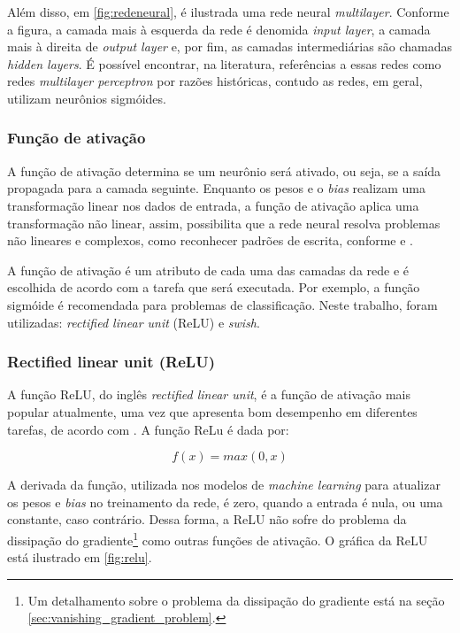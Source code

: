 Além disso, em \ref{fig:redeneural}, é ilustrada uma rede neural \textit{multilayer}.
Conforme a figura, a camada mais à esquerda da rede é 
denomida \textit{input layer}, a camada mais à direita de \textit{output layer}
e, por fim, as camadas intermediárias são chamadas \textit{hidden layers}.
É possível encontrar, na literatura, referências a essas redes como redes 
\textit{multilayer perceptron} por razões históricas, contudo as redes, em geral,
utilizam neurônios sigmóides.

\subsubsection{Função de ativação}
\label{sec:funcao_ativacao}

A função de ativação determina se um neurônio será ativado, ou seja, 
se a saída propagada para a camada seguinte. Enquanto os pesos 
e o \textit{bias} realizam uma transformação linear nos dados 
de entrada, a função de ativação aplica uma transformação não
linear, assim, possibilita que a rede neural resolva
problemas não lineares e complexos, como reconhecer padrões de 
escrita, conforme \cite{deeplearningbook} e \cite{zhang2021dive}. 

A função de ativação é um atributo de cada uma das camadas 
da rede e é escolhida de acordo com a tarefa que será 
executada. Por exemplo, a função sigmóide é recomendada
 para problemas de classificação. Neste trabalho, 
foram utilizadas: \textit{rectified linear unit} (ReLU) e \textit{swish}.

\subsubsection{Rectified linear unit (ReLU)}

A função ReLU, do inglês \textit{rectified linear unit}, é a
função de ativação mais popular atualmente, uma vez que apresenta bom desempenho 
em diferentes tarefas, de acordo com \cite{dl-oreilly}. A função ReLu é dada por:

\begin{equation}
  f(x) = max(0,x)
\end{equation}

A derivada da função, utilizada nos modelos de \textit{machine learning}
para atualizar os pesos e \textit{bias} no treinamento da rede, é zero, quando 
a entrada é nula, ou uma constante, caso contrário. Dessa
forma, a ReLU não sofre do problema da dissipação do gradiente\footnote{Um 
detalhamento sobre o problema da dissipação do gradiente está na seção \ref{sec:vanishing_gradient_problem}.} como
outras funções de ativação. O gráfica da ReLU está ilustrado em \ref{fig:relu}.

